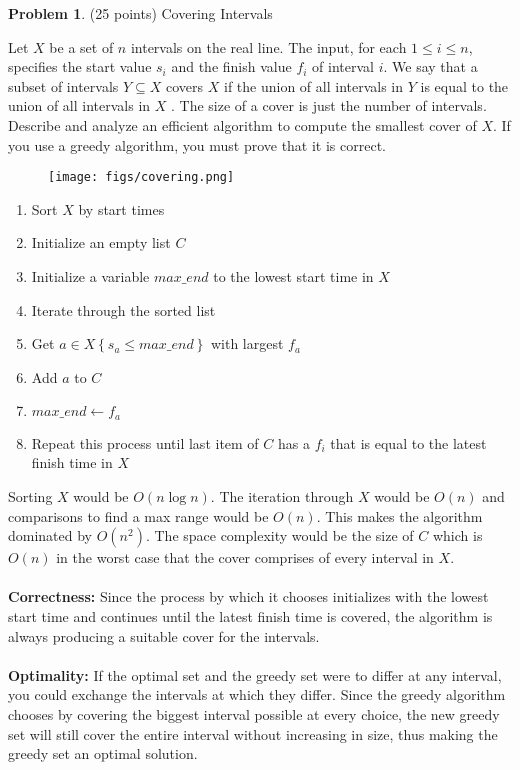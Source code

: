 \documentclass[11pt]{article}
\theoremstyle{definition}
\theoremstyle{theorem}
\newtheorem{prob}{Problem}
\begin{document}
\newpage

\begin{prob}
	(25 points) Covering Intervals
\end{prob}

Let $X$ be a set of $n$ intervals on the real line. The input, for each $1 \leq i \leq n$, specifies the start value $s_i$ and the finish value $f_i$ of interval $i$. We say that a subset of intervals $Y \subseteq X$ covers $X$ if the union of all intervals in $Y$ is equal to the union of all intervals in $X$ . The size of a cover is just the number of intervals. Describe and analyze an efficient algorithm to compute the smallest cover of $X$. If you use a greedy algorithm, you must prove that it is correct.

\begin{figure}[h]
     \centering
     \texttt{[image: figs/covering.png]}
 \end{figure}
\begin{enumerate}
    \item Sort $X$ by start times
    \item Initialize an empty list $C$
    \item Initialize a variable $max\_end$ to the lowest start time in $X$
    \item Iterate through the sorted list
    \item Get $a \in X \left\{ s_a \leq max\_end \right\}$ with largest $f_a$
    \item Add $a$ to $C$
    \item $max\_end \gets f_a$
    \item Repeat this process until last item of $C$ has a $f_i$ that is equal to the latest finish time in $X$
\end{enumerate}
Sorting $X$ would be $O(n \log n)$. The iteration through $X$ would be $O(n)$ and comparisons to find a max range would be $O(n)$. This makes the algorithm dominated by $O(n^{2})$. The space complexity would be the size of $C$ which is $O(n)$ in the worst case that the cover comprises of every interval in $X$. \\\\
\textbf{Correctness:} Since the process by which it chooses initializes with the lowest start time and continues until the latest finish time is covered, the algorithm is always producing a suitable cover for the intervals. \\\\
\textbf{Optimality:} If the optimal set and the greedy set were to differ at any interval, you could exchange the intervals at which they differ. Since the greedy algorithm chooses by covering the biggest interval possible at every choice, the new greedy set will still cover the entire interval without increasing in size, thus making the greedy set an optimal solution.
\end{document}
